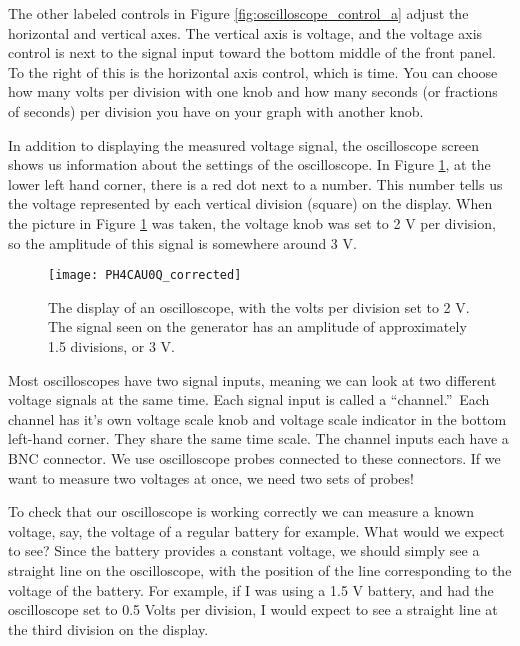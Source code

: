 The other labeled controls in Figure \ref{fig:oscilloscope_control_a} adjust the
horizontal and vertical axes. The vertical axis is voltage, and the voltage
axis control is next to the signal input toward the bottom middle of the
front panel. To the right of this is the horizontal axis control, which is
time. You can choose how many volts per division with one knob and how many
seconds (or fractions of seconds) per division you have on your graph with
another knob. 

In addition to displaying the measured voltage signal, the oscilloscope screen
shows us information about the settings of the oscilloscope. In Figure
\ref{fig:oscilloscope_display_a}, at the lower left hand corner, 
there is a red dot next to a number. This number tells us the voltage
represented by each vertical division (square) on the display. 
When the picture in Figure \ref{fig:oscilloscope_display_a} was taken,
the voltage knob was set to 2 V per division, so the amplitude of this 
signal is somewhere around 3 V.
\begin{figure}[htbp!]
\centering
\texttt{[image: PH4CAU0Q\_corrected]}
\caption[The display of an oscilloscope]{The display of an oscilloscope, with 
the volts per division set to 2 V. The signal seen on the generator has an
amplitude of approximately 1.5 divisions, or 3 V.}
\label{fig:oscilloscope_display_a}
\end{figure}


Most oscilloscopes have two signal inputs, meaning we can look at two
different voltage signals at the same time. Each signal input is called a
\textquotedblleft channel.\textquotedblright\ Each channel has it's own
voltage scale knob and voltage scale indicator in the bottom left-hand
corner. They share the same time scale.
The channel inputs each have a BNC connector. We use oscilloscope probes
connected to these connectors. 
If we want to measure two voltages at once, we need
two sets of probes!

To check that our oscilloscope is working correctly we can measure a known
voltage, say, the voltage of a regular battery for example. What would we 
expect to see? Since the battery provides a constant voltage, we should
simply see a straight line on the oscilloscope, with the position of the line
corresponding to the voltage of the battery. For example, if I was using a 
1.5 V battery, and had the oscilloscope set to 0.5 Volts per division, I
would expect to see a straight line at the third division on the display.

